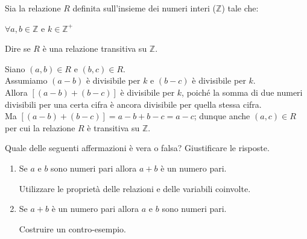 

\begin{esercizio}
    Sia la relazione $R$ definita sull'insieme dei numeri interi ($\mathbb{Z}$) tale che: 
	
	\begin{center}
		 $\forall a,b \in \mathbb{Z}$ e $k \in \mathbb{Z}^+$
	\end{center}
	
	\noindent 
	Dire se $R$ è una relazione transitiva su $\mathbb{Z}$. 
	
\end{esercizio}

\begin{soluzione}

Siano $(a,b) \in R$ e $(b,c) \in R$.\\
Assumiamo $(a-b)$ è divisibile per $k$ e $(b-c)$ è divisibile per $k$.\\
Allora $[(a-b) + (b-c)] $ è divisibile per $k$, poiché la somma di due numeri divisibili per una certa cifra è ancora divisibile per quella stessa cifra.\\
Ma $[(a-b) + (b-c)]=a-b+b-c=a-c$; dunque anche $(a,c)\in R$ per cui la relazione $R$ è transitiva su $\mathbb{Z}$.\\
    \vspace{0.10cm}
    
\end{soluzione}




\begin{esercizio}
    Quale delle seguenti affermazioni è vera o falsa? Giustificare le risposte.
	
	\begin{enumerate}\setlength\itemsep{1em}
		
		\item Se $a$ e $b$ sono numeri pari allora $a+b$ è un numero pari. 
		
		Utilizzare le proprietà delle relazioni e delle variabili coinvolte.
		\item Se $a+b$ è un numero pari allora $a$ e $b$ sono numeri pari. 
		
		Costruire un contro-esempio.
		
	\end{enumerate}
\end{esercizio}


